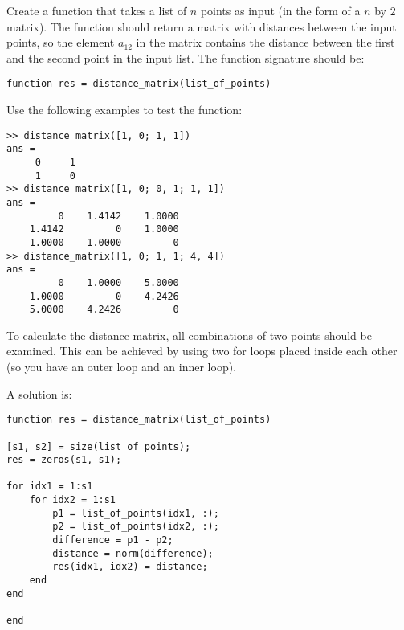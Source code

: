 \begin{ex}
Create a function that takes a list of $n$ points as input 
(in the form of a $n$ by $2$ matrix).
The function should return a matrix with distances between 
the input points, so the element $a_{12}$ in the matrix 
contains the distance between the first and the second point
in the input list.
The function signature should be:
\begin{lstlisting}
function res = distance_matrix(list_of_points)
\end{lstlisting}
Use the following examples to test the function:
\begin{lstlisting}
>> distance_matrix([1, 0; 1, 1])
ans =
     0     1
     1     0
>> distance_matrix([1, 0; 0, 1; 1, 1])
ans =
         0    1.4142    1.0000
    1.4142         0    1.0000
    1.0000    1.0000         0
>> distance_matrix([1, 0; 1, 1; 4, 4])
ans =
         0    1.0000    5.0000
    1.0000         0    4.2426
    5.0000    4.2426         0
\end{lstlisting}
\begin{hint}
To calculate the distance matrix, all combinations
of two points should be examined.
This can be achieved by using two for loops placed 
inside each other (so you have an outer loop and an 
inner loop).
\end{hint}
\begin{sol}
A solution is:
\begin{lstlisting}
function res = distance_matrix(list_of_points)

[s1, s2] = size(list_of_points);
res = zeros(s1, s1);

for idx1 = 1:s1
    for idx2 = 1:s1
        p1 = list_of_points(idx1, :);
        p2 = list_of_points(idx2, :);
        difference = p1 - p2;
        distance = norm(difference);
        res(idx1, idx2) = distance;
    end
end

end
\end{lstlisting}
\end{sol}
\end{ex}


